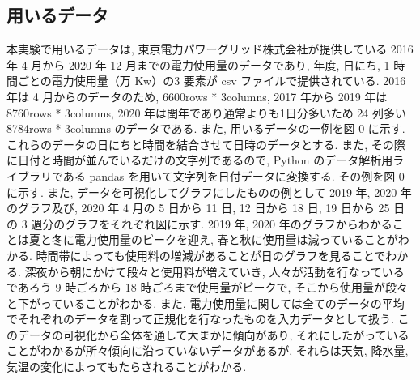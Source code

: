 \subsection{用いるデータ}
本実験で用いるデータは, 東京電力パワーグリッド株式会社が提供している 2016 年 4 月から 2020 年 12 月までの電力使用量のデータであり, 年度, 日にち, 1 時間ごとの電力使用量（万 Kw）の3 要素が csv ファイルで提供されている. 2016 年は 4 月からのデータのため, 6600rows * 3columns, 2017 年から 2019 年は 8760rows * 3columns, 2020 年は閏年であり通常よりも1日分多いため 24 列多い 8784rows * 3columns のデータである. また, 用いるデータの一例を図 0 に示す. これらのデータの日にちと時間を結合させて日時のデータとする. また, その際に日付と時間が並んでいるだけの文字列であるので, Python のデータ解析用ライブラリである pandas を用いて文字列を日付データに変換する. その例を図 0 に示す. また, データを可視化してグラフにしたものの例として 2019 年, 2020 年のグラフ及び,
2020 年 4 月の 5 日から 11 日, 12 日から 18 日, 19 日から 25 日の 3 週分のグラフをそれぞれ図に示す. 
2019 年, 2020 年のグラフからわかることは夏と冬に電力使用量のピークを迎え, 春と秋に使用量は減っていることがわかる. 時間帯によっても使用料の増減があることが日のグラフを見ることでわかる. 深夜から朝にかけて段々と使用料が増えていき, 人々が活動を行なっているであろう 9 時ごろから 18 時ごろまで使用量がピークで, そこから使用量が段々と下がっていることがわかる.
また, 電力使用量に関しては全てのデータの平均でそれぞれのデータを割って正規化を行なったものを入力データとして扱う.
このデータの可視化から全体を通して大まかに傾向があり, それにしたがっていることがわかるが所々傾向に沿っていないデータがあるが, それらは天気, 降水量, 気温の変化によってもたらされることがわかる.

